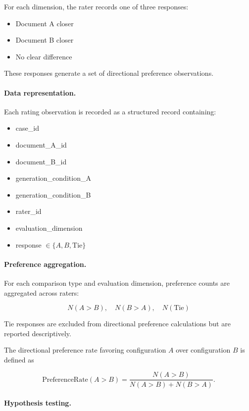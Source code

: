 For each dimension, the rater records one of three responses:

\begin{itemize}
\item Document A closer
\item Document B closer
\item No clear difference
\end{itemize}

These responses generate a set of directional preference observations.

\paragraph{Data representation.}

Each rating observation is recorded as a structured record containing:

\begin{itemize}
\item case\_id
\item document\_A\_id
\item document\_B\_id
\item generation\_condition\_A
\item generation\_condition\_B
\item rater\_id
\item evaluation\_dimension
\item response $\in \{A, B, \text{Tie}\}$
\end{itemize}

\paragraph{Preference aggregation.}

For each comparison type and evaluation dimension, preference counts are
aggregated across raters:

\[
N(A>B), \quad N(B>A), \quad N(\text{Tie})
\]

Tie responses are excluded from directional preference calculations but are
reported descriptively.

The directional preference rate favoring configuration $A$ over configuration
$B$ is defined as

\[
\text{PreferenceRate}(A>B) =
\frac{N(A>B)}{N(A>B) + N(B>A)}.
\]

\paragraph{Hypothesis testing.}

